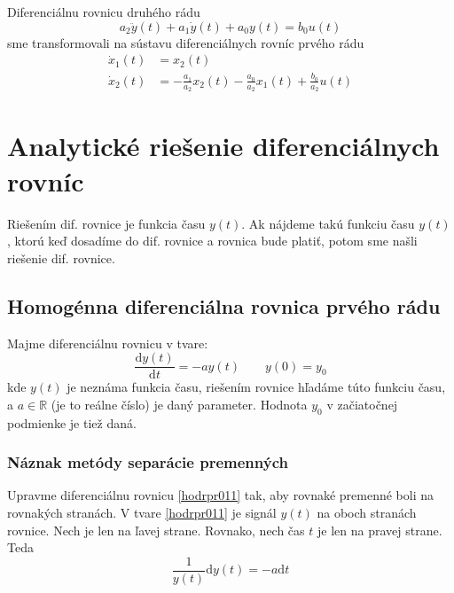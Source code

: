 \documentclass[a4paper, 10pt, ]{article}
\begin{document}
Diferenciálnu rovnicu druhého rádu
\begin{equation} 
    a_2 \ddot y(t) + a_1 \dot y(t) + a_0 y(t) = b_0 u(t)
\end{equation}
sme transformovali na sústavu diferenciálnych rovníc prvého rádu
\begin{align}
    \dot x_1(t) &= x_2(t) \\
    \dot x_2(t) &= - \frac{a_1}{a_2}  x_2(t) - \frac{a_0}{a_2} x_1(t) +  \frac{b_0}{a_2} u(t) 
\end{align}






















\section{Analytické riešenie diferenciálnych rovníc}

Riešením dif. rovnice je funkcia času $y(t)$. Ak nájdeme takú funkciu času $y(t)$, ktorú keď dosadíme do dif. rovnice a rovnica bude platiť, potom sme našli riešenie dif. rovnice.


\subsection{Homogénna diferenciálna rovnica prvého rádu}

Majme diferenciálnu rovnicu v tvare:
\begin{equation} \label{hodrpr011}
    \frac{\text{d}y(t)}{\text{d}t} = - a y(t) \qquad y(0)=y_0
\end{equation}
kde $y(t)$ je neznáma funkcia času, riešením rovnice hľadáme túto funkciu času, a $a\in\mathbb{R}$ (je to reálne číslo) je daný parameter. Hodnota $y_0$ v začiatočnej podmienke je tiež daná.



\subsubsection{Náznak metódy separácie premenných}

Upravme diferenciálnu rovnicu \eqref{hodrpr011} tak, aby rovnaké premenné boli na rovnakých stranách. V tvare \eqref{hodrpr011} je signál $y(t)$ na oboch stranách rovnice. Nech je len na ľavej strane. Rovnako, nech čas $t$ je len na pravej strane. Teda
\begin{equation} \label{diffRbeta2}
    \frac{1}{y(t)}\text{d}y(t) = - a \text{d}t
\end{equation}
\end{document}
